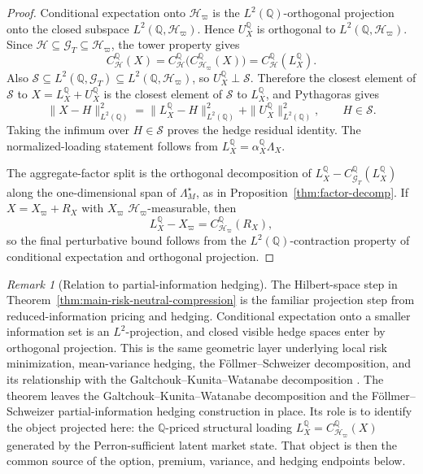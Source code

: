 \documentclass[11pt,a4paper]{amsart}
\theoremstyle{plain}
\theoremstyle{definition}
\theoremstyle{remark}
\newtheorem{remark}[theorem]{Remark}
\newcommand{\QQ}{\mathbb{Q}}
\newcommand{\cG}{\mathcal{G}}
\newcommand{\cH}{\mathcal{H}}
\newcommand{\cS}{\mathcal{S}}
\begin{document}
\begin{proof}
Conditional expectation onto \(\cH_\varpi\) is the \(L^2(\QQ)\)-orthogonal projection onto the
closed subspace \(L^2(\QQ,\cH_\varpi)\).  Hence \(U_X^\QQ\) is orthogonal to
\(L^2(\QQ,\cH_\varpi)\).  Since \(\cH\subseteq\cG_T\subseteq\cH_\varpi\), the tower property gives
\[
        C_{\cH}^\QQ(X)
        =
        C_{\cH}^\QQ\bigl(C_{\cH_\varpi}^\QQ(X)\bigr)
        =
        C_{\cH}^\QQ(L_X^\QQ).
\]
Also \(\cS\subseteq L^2(\QQ,\cG_T)\subseteq L^2(\QQ,\cH_\varpi)\), so
\(U_X^\QQ\perp\cS\).  Therefore the closest element of \(\cS\) to \(X=L_X^\QQ+U_X^\QQ\) is the
closest element of \(\cS\) to \(L_X^\QQ\), and Pythagoras gives
\[
        \|X-H\|_{L^2(\QQ)}^2
        =
        \|L_X^\QQ-H\|_{L^2(\QQ)}^2+\|U_X^\QQ\|_{L^2(\QQ)}^2,
        \qquad H\in\cS.
\]
Taking the infimum over \(H\in\cS\) proves the hedge residual identity.  The normalized-loading
statement follows from \(L_X^\QQ=\alpha_X^\QQ\Lambda_X\).

The aggregate-factor split is the orthogonal decomposition of
\(L_X^\QQ-C_{\cG_T}^\QQ(L_X^\QQ)\) along the one-dimensional span of
\(\Lambda_M^\star\), as in Proposition~\ref{thm:factor-decomp}.  If \(X=X_\varpi+R_X\) with
\(X_\varpi\) \(\cH_\varpi\)-measurable, then
\[
        L_X^\QQ-X_\varpi=C_{\cH_\varpi}^\QQ(R_X),
\]
so the final perturbative bound follows from the \(L^2(\QQ)\)-contraction property of conditional
expectation and orthogonal projection.
\end{proof}

\begin{remark}[Relation to partial-information hedging]\label{rem:partial-information-positioning}
The Hilbert-space step in Theorem~\ref{thm:main-risk-neutral-compression} is the familiar
projection step from reduced-information pricing and hedging.  Conditional expectation onto a
smaller information set is an \(L^2\)-projection, and closed visible hedge spaces enter by
orthogonal projection.  This is the same geometric layer underlying local risk minimization,
mean-variance hedging, the F\"ollmer--Schweizer decomposition, and its relationship with the
Galtchouk--Kunita--Watanabe decomposition
\cite{follmerSondermann1986,follmerSchweizer1991,schweizer1992meanVariance,
schweizer1995minimal,choulliVandaeleVanmaele2010}.  The theorem leaves the Galtchouk--Kunita--Watanabe decomposition and the F\"ollmer--Schweizer
partial-information hedging construction in place.  Its role is to identify the object projected here: the
\(\QQ\)-priced structural loading \(L_X^\QQ=C_{\cH_\varpi}^{\QQ}(X)\) generated by the
Perron-sufficient latent market state.  That object is then the common source of the option,
premium, variance, and hedging endpoints below.
\end{remark}
\end{document}
